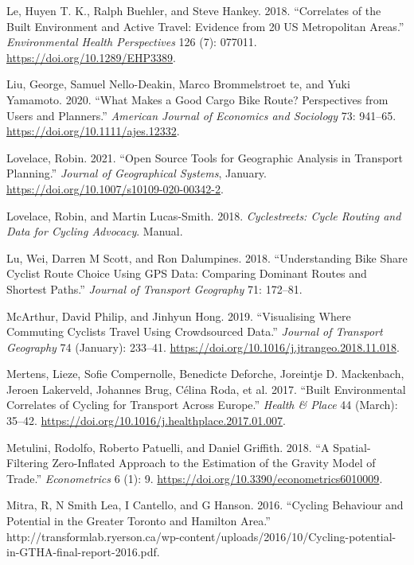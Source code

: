 \documentclass[smallextended]{svjour3}       %
\begin{document}
\leavevmode\hypertarget{ref-Le2018}{}%
Le, Huyen T. K., Ralph Buehler, and Steve Hankey. 2018. ``Correlates of
the Built Environment and Active Travel: Evidence from 20 US
Metropolitan Areas.'' \emph{Environmental Health Perspectives} 126 (7):
077011. \url{https://doi.org/10.1289/EHP3389}.

\leavevmode\hypertarget{ref-liuWhatMakesGood2020}{}%
Liu, George, Samuel Nello-Deakin, Marco Brommelstroet te, and Yuki
Yamamoto. 2020. ``What Makes a Good Cargo Bike Route? Perspectives from
Users and Planners.'' \emph{American Journal of Economics and Sociology}
73: 941--65. \url{https://doi.org/10.1111/ajes.12332}.

\leavevmode\hypertarget{ref-lovelaceOpenSourceTools2021}{}%
Lovelace, Robin. 2021. ``Open Source Tools for Geographic Analysis in
Transport Planning.'' \emph{Journal of Geographical Systems}, January.
\url{https://doi.org/10.1007/s10109-020-00342-2}.

\leavevmode\hypertarget{ref-Lovelace2018}{}%
Lovelace, Robin, and Martin Lucas-Smith. 2018. \emph{Cyclestreets: Cycle
Routing and Data for Cycling Advocacy}. Manual.

\leavevmode\hypertarget{ref-Lu2018understanding}{}%
Lu, Wei, Darren M Scott, and Ron Dalumpines. 2018. ``Understanding Bike
Share Cyclist Route Choice Using GPS Data: Comparing Dominant Routes and
Shortest Paths.'' \emph{Journal of Transport Geography} 71: 172--81.

\leavevmode\hypertarget{ref-McArthur2019}{}%
McArthur, David Philip, and Jinhyun Hong. 2019. ``Visualising Where
Commuting Cyclists Travel Using Crowdsourced Data.'' \emph{Journal of
Transport Geography} 74 (January): 233--41.
\url{https://doi.org/10.1016/j.jtrangeo.2018.11.018}.

\leavevmode\hypertarget{ref-Mertens2017}{}%
Mertens, Lieze, Sofie Compernolle, Benedicte Deforche, Joreintje D.
Mackenbach, Jeroen Lakerveld, Johannes Brug, Célina Roda, et al. 2017.
``Built Environmental Correlates of Cycling for Transport Across
Europe.'' \emph{Health \& Place} 44 (March): 35--42.
\url{https://doi.org/10.1016/j.healthplace.2017.01.007}.

\leavevmode\hypertarget{ref-Metulini2018}{}%
Metulini, Rodolfo, Roberto Patuelli, and Daniel Griffith. 2018. ``A
Spatial-Filtering Zero-Inflated Approach to the Estimation of the
Gravity Model of Trade.'' \emph{Econometrics} 6 (1): 9.
\url{https://doi.org/10.3390/econometrics6010009}.

\leavevmode\hypertarget{ref-Mitra2016}{}%
Mitra, R, N Smith Lea, I Cantello, and G Hanson. 2016. ``Cycling
Behaviour and Potential in the Greater Toronto and Hamilton Area.''
http://transformlab.ryerson.ca/wp-content/uploads/2016/10/Cycling-potential-in-GTHA-final-report-2016.pdf.
\end{document}

